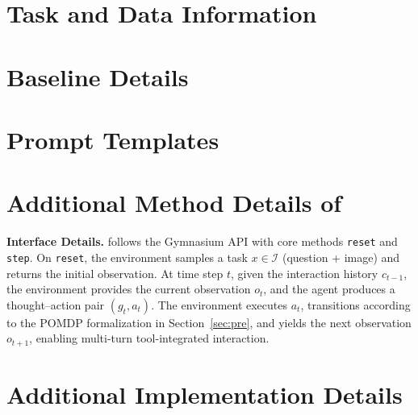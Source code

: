 \clearpage
\setcounter{page}{1}
\maketitlesupplementary

\section{Task and Data Information}
\label{app:data}


\section{Baseline Details}
\label{app:baseline}


\section{Prompt Templates}
\label{app:prompt}


% 


\section{Additional Method Details of \env{}}
\label{app:method}
\noindent\textbf{Interface Details.}
\env{} follows the Gymnasium API with core methods \texttt{reset} and \texttt{step}. On \texttt{reset}, the environment samples a task \(x \in \mathcal{I}\) (question + image) and returns the initial observation. At time step \(t\), given the interaction history \(c_{t-1}\), the environment provides the current observation \(o_t\), and the agent produces a thought–action pair \((g_t, a_t)\). The environment executes \(a_t\), transitions according to the POMDP formalization in Section~\ref{sec:pre}, and yields the next observation \(o_{t+1}\), enabling multi-turn tool-integrated interaction.



\section{Additional Implementation Details}
\label{app:implementation}



% 



